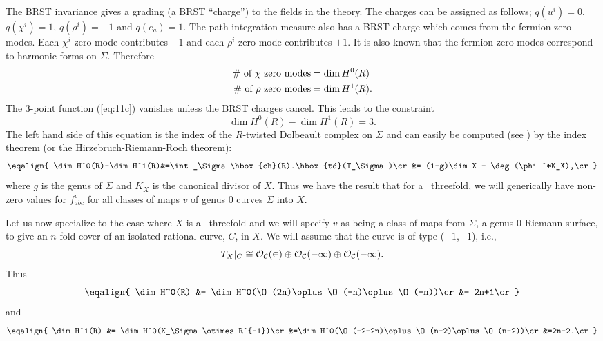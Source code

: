 The BRST invariance gives a grading (a BRST ``charge'') to the fields
in the theory. The charges can be assigned as follows;
$q(u^i)=0$, $q(\chi^i)=1$,
$q(\rho^i)=-1$ and $q(e_a)=1$. The path integration measure also has a
BRST charge which comes from the fermion zero modes. Each $\chi^i$ zero
mode contributes $-1$ and each $\rho^i$ zero mode contributes $+1$. It
is also known that the fermion zero modes correspond to harmonic forms
on $\Sigma$. Therefore
\begin{align}
  \hbox{\# of $\chi$ zero modes}&=\dim H^0(R)\notag\\
  \hbox{\# of $\rho$ zero modes}&=\dim H^1(R).
\end{align}
The 3-point function (\ref{eq:11c}) vanishes unless the BRST charges
cancel. This leads to the constraint
\begin{equation}
  \dim H^0(R)-\dim H^1(R)=3.
\end{equation}
The left hand side of this equation is the index of the $R$-twisted
Dolbeault complex on $\Sigma$ and can easily be
computed (see \cite{CKM:hdcg}) by the index theorem
(or the Hirzebruch-Riemann-Roch theorem):
\begin{equation}
  \eqalign{
  \dim H^0(R)-\dim H^1(R)&=\int_\Sigma\hbox{ch}(R).\hbox{td}(T_\Sigma)\cr
   &= (1-g)\dim X - \deg(\phi^*K_X),\cr}
\end{equation}
where $g$ is the genus of $\Sigma$ and $K_X$ is the canonical divisor
of $X$. Thus we have the result that for a \CY\ threefold, we will
generically have non-zero values for $f^v_{abc}$ for all classes of
maps $v$ of genus 0 curves $\Sigma$ into $X$.

Let us now specialize to the case where $X$ is a \CY\ threefold and we
will specify $v$ as being a class of maps from $\Sigma$, a genus 0
Riemann surface, to give an $n$-fold cover of an
isolated rational curve, $C$, in $X$. We will assume that the curve is
of type ($-1$,$-1$), i.e.,
\begin{equation}
  T_X|_C\cong \cal O_C(2)\oplus\cal O_C(-1)\oplus\cal O_C(-1).
\end{equation}
Thus
\begin{equation}
  \eqalign{
  \dim H^0(R) &= \dim H^0(\O(2n)\oplus\O(-n)\oplus\O(-n))\cr
	&= 2n+1\cr}
\end{equation}
and
\begin{equation}
  \eqalign{
  \dim H^1(R) &= \dim H^0(K_\Sigma\otimes R^{-1})\cr
	&=\dim H^0(\O(-2-2n)\oplus\O(n-2)\oplus\O(n-2))\cr
	&=2n-2.\cr}
\end{equation}

